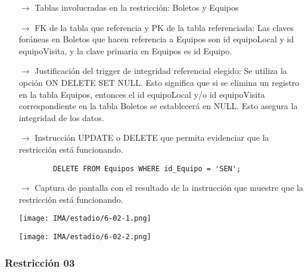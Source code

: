 \begin{itemize}
    \item[$\rightarrow$] Tablas involucradas en la restricción: Boletos y Equipos
    \item[$\rightarrow$] FK de la tabla que referencia y PK de la tabla referenciada: Las claves foráneas en Boletos que hacen referencia a Equipos son id equipoLocal y id equipoVisita, y la clave primaria en Equipos es id Equipo.
    \item[$\rightarrow$] Justificación del trigger de integridad referencial elegido: Se utiliza la opción ON DELETE SET NULL. Esto significa que si se elimina un registro en la tabla Equipos, entonces el id equipoLocal y/o id equipoVisita correspondiente en la tabla Boletos se establecerá en NULL. Esto asegura la integridad de los datos.
    \item[$\rightarrow$] Instrucción UPDATE o DELETE que permita evidenciar que la restricción está
    funcionando.
    \begin{verbatim}
        DELETE FROM Equipos WHERE id_Equipo = 'SEN';
    \end{verbatim}
    \item[$\rightarrow$] Captura de pantalla con el resultado de la instrucción que muestre que la restricción está
    funcionando.
    \begin{center}
        \texttt{[image: IMA/estadio/6-02-1.png]}

        \texttt{[image: IMA/estadio/6-02-2.png]}
    \end{center}
\end{itemize}



\subsubsection*{Restricción 03}

